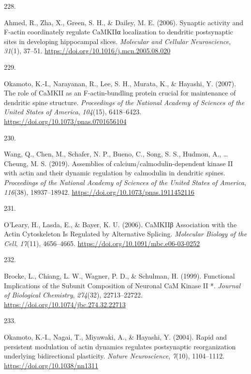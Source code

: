 \documentclass[
  11pt,
  letterpaper,
]{scrreprt}
\newlength{\cslhangindent}
\newlength{\csllabelwidth}
\newenvironment{CSLReferences}[2] %
 {\begin{list}{}{%
  \setlength{\itemindent}{0pt}
  \setlength{\leftmargin}{0pt}
  \setlength{\parsep}{0pt}
  \ifodd #1
   \setlength{\leftmargin}{\cslhangindent}
   \setlength{\itemindent}{-1\cslhangindent}
  \fi
  \setlength{\itemsep}{#2\baselineskip}}}
 {\end{list}}
\newcommand{\CSLLeftMargin}[1]{\parbox[t]{\csllabelwidth}{\strut#1\strut}}
\newcommand{\CSLRightInline}[1]{\parbox[t]{\linewidth - \csllabelwidth}{\strut#1\strut}}
\begin{document}
\begin{CSLReferences}{0}{0}
\CSLLeftMargin{228. }%
\CSLRightInline{Ahmed, R., Zha, X., Green, S. H., \& Dailey, M. E.
(2006). Synaptic activity and {F-actin} coordinately regulate {CaMKIIα}
localization to dendritic postsynaptic sites in developing hippocampal
slices. \emph{Molecular and Cellular Neuroscience}, \emph{31}(1),
37--51. \url{https://doi.org/10.1016/j.mcn.2005.08.020}}

\CSLLeftMargin{229. }%
\CSLRightInline{Okamoto, K.-I., Narayanan, R., Lee, S. H., Murata, K.,
\& Hayashi, Y. (2007). The role of {CaMKII} as an {F-actin-bundling}
protein crucial for maintenance of dendritic spine structure.
\emph{Proceedings of the National Academy of Sciences of the United
States of America}, \emph{104}(15), 6418--6423.
\url{https://doi.org/10.1073/pnas.0701656104}}

\CSLLeftMargin{230. }%
\CSLRightInline{Wang, Q., Chen, M., Schafer, N. P., Bueno, C., Song, S.
S., Hudmon, A., \ldots{} Cheung, M. S. (2019). Assemblies of
calcium/calmodulin-dependent kinase {II} with actin and their dynamic
regulation by calmodulin in dendritic spines. \emph{Proceedings of the
National Academy of Sciences of the United States of America},
\emph{116}(38), 18937--18942.
\url{https://doi.org/10.1073/pnas.1911452116}}

\CSLLeftMargin{231. }%
\CSLRightInline{O'Leary, H., Lasda, E., \& Bayer, K. U. (2006). {CaMKIIβ
Association} with the {Actin Cytoskeleton Is Regulated} by {Alternative
Splicing}. \emph{Molecular Biology of the Cell}, \emph{17}(11),
4656--4665. \url{https://doi.org/10.1091/mbc.e06-03-0252}}

\CSLLeftMargin{232. }%
\CSLRightInline{Brocke, L., Chiang, L. W., Wagner, P. D., \& Schulman,
H. (1999). Functional {Implications} of the {Subunit Composition} of
{Neuronal CaM Kinase II} *. \emph{Journal of Biological Chemistry},
\emph{274}(32), 22713--22722.
\url{https://doi.org/10.1074/jbc.274.32.22713}}

\CSLLeftMargin{233. }%
\CSLRightInline{Okamoto, K.-I., Nagai, T., Miyawaki, A., \& Hayashi, Y.
(2004). Rapid and persistent modulation of actin dynamics regulates
postsynaptic reorganization underlying bidirectional plasticity.
\emph{Nature Neuroscience}, \emph{7}(10), 1104--1112.
\url{https://doi.org/10.1038/nn1311}}


\end{CSLReferences}
\end{document}
